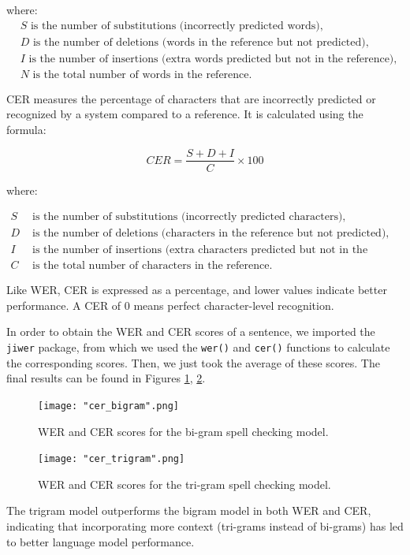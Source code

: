 \documentclass[11pt, a4paper]{article}
\begin{document}
    where:
    \begin{align*}
    & S \text{ is the number of substitutions (incorrectly predicted words)}, \\
    & D \text{ is the number of deletions (words in the reference but not predicted)}, \\
    & I \text{ is the number of insertions (extra words predicted but not in the reference)}, \\
    & N \text{ is the total number of words in the reference}.
    \end{align*}

    CER measures the percentage of characters that are incorrectly predicted or recognized by a system compared to a reference. It is calculated using the formula:

    \[ CER = \frac{S + D + I}{C} \times 100 \]

    where:

    \begin{align*}
    S & \text{ is the number of substitutions (incorrectly predicted characters),} \\
    D & \text{ is the number of deletions (characters in the reference but not predicted),} \\
    I & \text{ is the number of insertions (extra characters predicted but not in the reference),} \\
    C & \text{ is the total number of characters in the reference.}
    \end{align*}

    Like WER, CER is expressed as a percentage, and lower values indicate better performance. A CER of 0 means perfect character-level recognition.

    
	In order to obtain the WER and CER scores of a sentence, we imported the \texttt{jiwer} package, from which we used the \texttt{wer()} and \texttt{cer()} functions to calculate the corresponding scores. Then, we just took the average of these scores. The final results can be found in Figures \ref{fig::cer_bigram}, \ref{fig::cer_trigram}.
	

	 \begin{figure}
	    \centering
	    \texttt{[image: "cer\_bigram".png]}
	    \caption{WER and CER scores for the bi-gram spell checking model.}
	    \label{fig::cer_bigram}
	\end{figure}
	
	
	 \begin{figure}
	    \centering
	    \texttt{[image: "cer\_trigram".png]}
	    \caption{WER and CER scores for the tri-gram spell checking model.}
	    \label{fig::cer_trigram}
	\end{figure}
 
	The trigram model outperforms the bigram model in both WER and CER, indicating that incorporating more context (tri-grams instead of bi-grams) has led to better language model performance.
	
\end{document}
